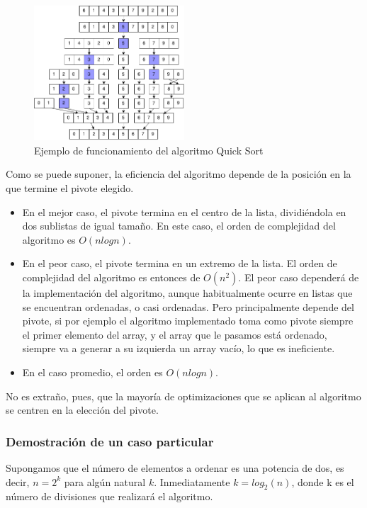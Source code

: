 \documentclass[8pt, A4]{article}    %
\begin{document}
\begin{figure}[h]
\begin{center}
\includegraphics[width=0.5\textwidth]{graph/quick-sort-info}
\end{center}
\caption{Ejemplo de funcionamiento del algoritmo Quick Sort}
\label{fig:QuickSortInfo}
\end{figure}

Como se puede suponer, la eficiencia del algoritmo depende de la posición en la que termine el pivote elegido.

\begin{itemize}
    \item En el mejor caso, el pivote termina en el centro de la lista, dividiéndola en dos sublistas de igual tamaño. En este caso, el orden de complejidad del algoritmo es $O(nlog n)$.
    \item En el peor caso, el pivote termina en un extremo de la lista. El orden de complejidad del algoritmo es entonces de $O(n^2)$. El peor caso dependerá de la implementación del algoritmo, aunque habitualmente ocurre en listas que se encuentran ordenadas, o casi ordenadas. Pero principalmente depende del pivote, si por ejemplo el algoritmo implementado toma como pivote siempre el primer elemento del array, y el array que le pasamos está ordenado, siempre va a generar a su izquierda un array vacío, lo que es ineficiente.

    \item En el caso promedio, el orden es $O(nlog n)$.
\end{itemize}

No es extraño, pues, que la mayoría de optimizaciones que se aplican al algoritmo se centren en la elección del pivote.

\subsubsection{Demostración de un caso particular}
Supongamos que el número de elementos a ordenar es una potencia de dos, es decir, ${\displaystyle n=2^{k}}$ para algún natural ${\displaystyle k}$. Inmediatamente ${\displaystyle k=log_{2}(n)}$, donde k es el número de divisiones que realizará el algoritmo.
\end{document}
